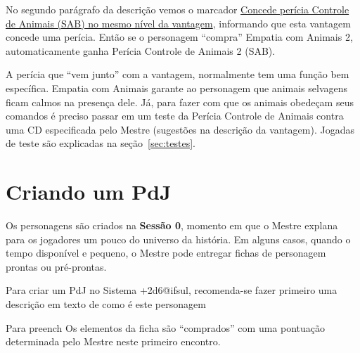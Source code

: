 No segundo parágrafo da descrição vemos o marcador \underline{Concede perícia Controle de Animais (SAB) no mesmo nível da vantagem}, informando que esta vantagem concede uma perícia. Então se o personagem ``compra'' Empatia com Animais 2, automaticamente ganha Perícia Controle de Animais 2 (SAB). 

A perícia que ``vem junto'' com a vantagem, normalmente tem uma função bem específica. Empatia com Animais garante ao personagem que animais selvagens ficam calmos na presença dele. Já, para fazer com que os animais obedeçam seus comandos é preciso passar em um teste da Perícia Controle de Animais contra uma CD especificada pelo Mestre (sugestões na descrição da vantagem). Jogadas de teste são explicadas na seção~\ref{sec:testes}.


\section{\label{sec:criapdj}Criando um PdJ}
Os personagens são criados na \textbf{Sessão 0}, momento em que o Mestre explana para os jogadores um pouco do universo da história. Em alguns casos, quando o tempo disponível e pequeno, o Mestre pode entregar fichas de personagem prontas ou pré-prontas.

Para criar um PdJ no Sistema +2d6@ifsul, recomenda-se fazer primeiro uma descrição em texto de como é este personagem


Para preench
Os elementos da ficha são ``comprados'' com uma pontuação determinada pelo Mestre neste primeiro encontro.
